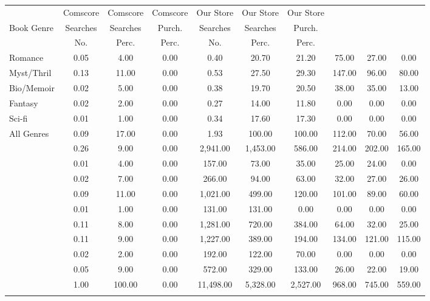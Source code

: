 \begin{center}
\begin{tabular}{lccccccccc}
\hline \noalign{\smallskip} & Comscore & Comscore & Comscore & Our Store & Our Store & Our Store &  &  & \\
Book Genre & Searches & Searches & Purch. & Searches & Searches & Purch. &  &  & \\
 & No. & Perc. & Perc. & No. & Perc. & Perc. &  &  & \\
\noalign{\smallskip}\hline \noalign{\smallskip}Romance & 0.05 & 4.00 & 0.00 & 0.40 & 20.70 & 21.20 & 75.00 & 27.00 & 0.00\\
Myst/Thril & 0.13 & 11.00 & 0.00 & 0.53 & 27.50 & 29.30 & 147.00 & 96.00 & 80.00\\
Bio/Memoir & 0.02 & 5.00 & 0.00 & 0.38 & 19.70 & 20.50 & 38.00 & 35.00 & 13.00\\
Fantasy & 0.02 & 2.00 & 0.00 & 0.27 & 14.00 & 11.80 & 0.00 & 0.00 & 0.00\\
Sci-fi & 0.01 & 1.00 & 0.00 & 0.34 & 17.60 & 17.30 & 0.00 & 0.00 & 0.00\\
All Genres & 0.09 & 17.00 & 0.00 & 1.93 & 100.00 & 100.00 & 112.00 & 70.00 & 56.00\\
 & 0.26 & 9.00 & 0.00 & 2,941.00 & 1,453.00 & 586.00 & 214.00 & 202.00 & 165.00\\
 & 0.01 & 4.00 & 0.00 & 157.00 & 73.00 & 35.00 & 25.00 & 24.00 & 0.00\\
 & 0.02 & 7.00 & 0.00 & 266.00 & 94.00 & 63.00 & 32.00 & 27.00 & 26.00\\
 & 0.09 & 11.00 & 0.00 & 1,021.00 & 499.00 & 120.00 & 101.00 & 89.00 & 60.00\\
 & 0.01 & 1.00 & 0.00 & 131.00 & 131.00 & 0.00 & 0.00 & 0.00 & 0.00\\
 & 0.11 & 8.00 & 0.00 & 1,281.00 & 720.00 & 384.00 & 64.00 & 32.00 & 25.00\\
 & 0.11 & 9.00 & 0.00 & 1,227.00 & 389.00 & 194.00 & 134.00 & 121.00 & 115.00\\
 & 0.02 & 2.00 & 0.00 & 192.00 & 122.00 & 70.00 & 0.00 & 0.00 & 0.00\\
 & 0.05 & 9.00 & 0.00 & 572.00 & 329.00 & 133.00 & 26.00 & 22.00 & 19.00\\
 & 1.00 & 100.00 & 0.00 & 11,498.00 & 5,328.00 & 2,527.00 & 968.00 & 745.00 & 559.00\\
\noalign{\smallskip}\hline\end{tabular}\\
\end{center}
